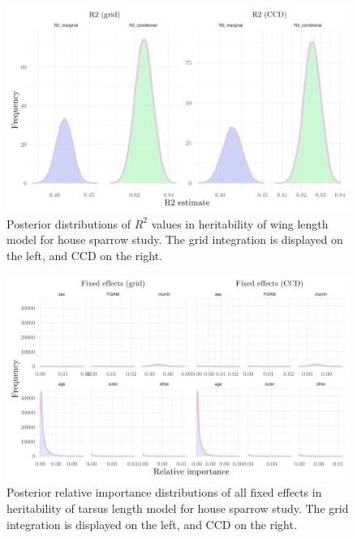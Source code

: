 \begin{figure}[H]%
  \centering
  \includegraphics[width=1\linewidth]{Figures/House sparrow study/Wing_r2.png}
  \caption[Posterior distributions of $R^2$ values in wing length model for house sparrow study]{Posterior distributions of $R^2$ values in heritability of wing length model for house sparrow study. The grid integration is displayed on the left, and CCD on the right.}
  \label{fig:wing_r2}
\end{figure}

\begin{figure}[H]%
  \centering
  \includegraphics[width=1\linewidth]{Figures/House sparrow study/Tarsus_fixed.png}
  \caption[Posterior relative importance distributions of all fixed effects in tarsus length model for house sparrow study]{Posterior relative importance distributions of all fixed effects in heritability of tarsus length model for house sparrow study. The grid integration is displayed on the left, and CCD on the right.}
  \label{fig:tarsus_fixed_sparrows}
\end{figure}

